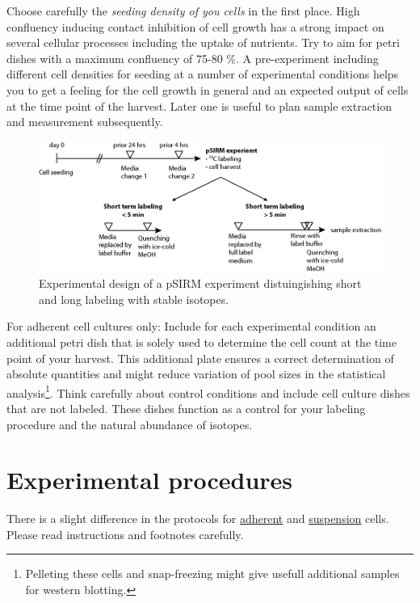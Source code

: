 \documentclass[]{book}
\let\rmarkdownfootnote\footnote%
\def\footnote{\protect\rmarkdownfootnote}
\theoremstyle{definition}
\theoremstyle{definition}
\theoremstyle{definition}
\theoremstyle{remark}
\begin{document}
Choose carefully the \emph{seeding density of you cells} in the first
place. High confluency inducing contact inhibition of cell growth has a
strong impact on several cellular processes including the uptake of
nutrients. Try to aim for petri dishes with a maximum confluency of
75-80 \%. A pre-experiment including different cell densities for
seeding at a number of experimental conditions helps you to get a
feeling for the cell growth in general and an expected output of cells
at the time point of the harvest. Later one is useful to plan sample
extraction and measurement subsequently.

\begin{figure}
\centering
\includegraphics{images/psirm_harvest.png}
\caption{\label{fig:psirmexp}Experimental design of a pSIRM experiment
distuingishing short and long labeling with stable isotopes.}
\end{figure}

For adherent cell cultures only: Include for each experimental condition
an additional petri dish that is solely used to determine the cell count
at the time point of your harvest. This additional plate ensures a
correct determination of absolute quantities and might reduce variation
of pool sizes in the statistical analysis\footnote{Pelleting these cells
  and snap-freezing might give usefull additional samples for western
  blotting.}. Think carefully about control conditions and include cell
culture dishes that are not labeled. These dishes function as a control
for your labeling procedure and the natural abundance of isotopes.

\section{Experimental procedures}\label{experimental-procedures}

There is a slight difference in the protocols for
\protect\hyperlink{psirm:adherent}{adherent} and
\protect\hyperlink{psirm:suspension}{suspension} cells. Please read
instructions and footnotes carefully.
\end{document}
